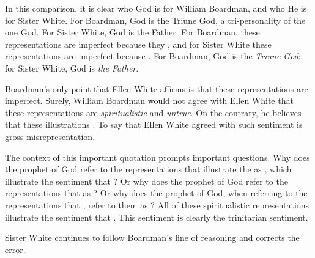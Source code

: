 In this comparison, it is clear who God is for William Boardman, and who He is for Sister White. For Boardman, God is the Triune God, a tri-personality of the one God. For Sister White, God is the Father. For Boardman, these representations are imperfect because they , and for Sister White these representations are imperfect because . For Boardman, God is the \textit{Triune God}; for Sister White, God is \textit{the Father}.

Boardman’s only point that Ellen White affirms is that these representations are imperfect. Surely, William Boardman would not agree with Ellen White that these representations are \textit{spiritualistic} and \textit{untrue}. On the contrary, he believes that these illustrations . To say that Ellen White agreed with such sentiment is gross misrepresentation.

The context of this important quotation prompts important questions. Why does the prophet of God refer to the representations that illustrate the  as , which illustrate the sentiment that ? Or why does the prophet of God refer to the representations that  as ? Or why does the prophet of God, when referring to the representations that , refer to them as ? All of these spiritualistic representations illustrate the sentiment that . This sentiment is clearly the trinitarian sentiment.

Sister White continues to follow Boardman’s line of reasoning and corrects the error.

